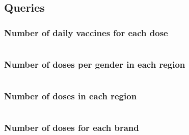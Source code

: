 \documentclass[12pt, a4paper]{article}
\begin{document}
\subsection{Queries}


\subsubsection{Number of daily vaccines for each dose}

\begin{tcolorbox}[fontupper=\scriptsize]
    \begin{verbatim}
    \end{verbatim}
\end{tcolorbox}

\noindent
\blindtext

\subsubsection{Number of doses per gender in each region}

\begin{tcolorbox}[fontupper=\scriptsize]
    \begin{verbatim}
    \end{verbatim}
\end{tcolorbox}

\noindent
\blindtext

\subsubsection{Number of doses in each region}

\begin{tcolorbox}[fontupper=\scriptsize]
    \begin{verbatim}
    \end{verbatim}
\end{tcolorbox}

\noindent
\blindtext

\subsubsection{Number of doses for each brand}

\begin{tcolorbox}[fontupper=\scriptsize]
    \begin{verbatim}
    \end{verbatim}
\end{tcolorbox}
\end{document}
